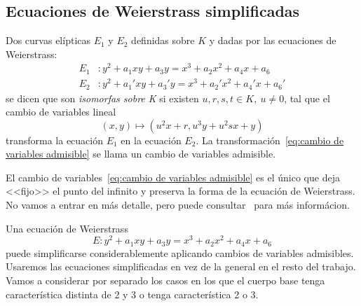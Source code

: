 \subsection{Ecuaciones de Weierstrass simplificadas}
\label{sub:Ecuaciones de Weierstrass simplificadas}

\begin{definicion}
	Dos curvas elípticas $E_1$ y $E_2$ definidas sobre $K$ y dadas por las ecuaciones de Weierstrass:
	\begin{align*}
		E_1 &: y^2 + a_1 x y + a_3 y = x^3 + a_2 x^2 + a_4 x + a_6 \\
		E_2 &: y^2 + a_1' x y + a_3' y = x^3 + a_2' x^2 + a_4' x + a_6'
	\end{align*}
	se dicen que son \emph{isomorfas sobre K} si existen $u, r, s, t \in K,\ u \neq 0$, tal que el cambio de variables lineal
	\begin{equation}\label{eq:cambio de variables admisible}
	(x, y) \mapsto (u^2 x + r, u^3 y + u^2 s x + y)
	\end{equation}
	transforma la ecuación $E_1$ en la ecuación $E_2$. La transformación~\eqref{eq:cambio de variables admisible} se llama un cambio de variables admisible.

	El cambio de variables~\eqref{eq:cambio de variables admisible} es el único que deja <<fijo>> el punto del infinito y preserva la forma de la ecuación de Weierstrass. No vamos a entrar en más detalle, pero puede consultar~\cite[prop. III.3.1b]{Silverman:2009} para más informácion.
\end{definicion}


Una ecuación de Weierstrass
$$
E:  y^2 + a_1 x y + a_3 y = x^3 + a_2 x^2 + a_4 x + a_6
$$
puede simplificarse considerablemente aplicando cambios de variables admisibles. Usaremos las ecuaciones simplificadas en vez de la general en el resto del trabajo. Vamos a considerar por separado los casos en los que el cuerpo base tenga característica distinta de 2 y 3 o tenga característica 2 o 3.

